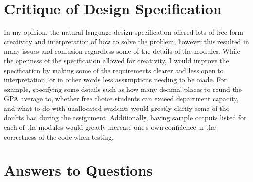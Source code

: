\documentclass[12pt]{article}
\begin{document}
\section{Critique of Design Specification}

In my opinion, the natural language design specification offered lots of free form creativity and interpretation of how to solve the problem, however this resulted in many issues and confusion regardless some of the details of the modules. While the openness of the specification allowed for creativity, I would improve the specification by making some of the requirements clearer and less open to interpretation, or in other words less assumptions needing to be made. For example, specifying some details such as how many decimal places to round the GPA average to, whether free choice students can exceed department capacity, and what to do with unallocated students would greatly clarify some of the doubts had during the assignment.  Additionally, having sample outputs listed for each of the modules would greatly increase one's own confidence in the correctness of the code when testing.

\newpage

\section{Answers to Questions}
\end{document}
